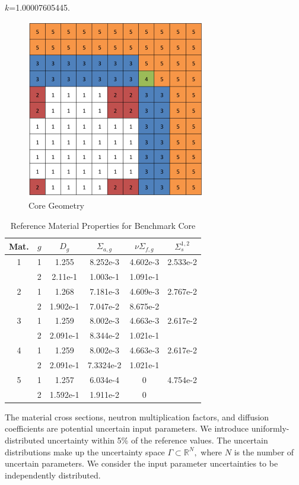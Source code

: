 \documentclass{anstrans} \usepackage{amsmath} \usepackage{amssymb}
\begin{document}
  $k$=1.00007605445.  \begin{figure}[H] \centering \includegraphics[width=0.5\linewidth]{../graphics/core}
    \caption{Core Geometry} \label{geom} \end{figure} \begin{table}[h] \centering \begin{tabular}{c c | c c c
      c} Mat. & $g$ & $D_g$ & $\Sigma_{a,g}$ & $\nu\Sigma_{f,g}$ & $\Sigma_s^{1,2}$ \\ \hline 1 & 1 & 1.255 &
      8.252e-3 & 4.602e-3 & 2.533e-2 \\ & 2 & 2.11e-1 & 1.003e-1 & 1.091e-1 & \\ \hline 2 & 1 & 1.268 &
      7.181e-3 & 4.609e-3 & 2.767e-2 \\ & 2 & 1.902e-1 & 7.047e-2 & 8.675e-2 & \\ \hline 3 & 1 & 1.259 &
      8.002e-3 & 4.663e-3 & 2.617e-2 \\ & 2 & 2.091e-1 & 8.344e-2 & 1.021e-1 & \\ \hline 4 & 1 & 1.259 &
      8.002e-3 & 4.663e-3 & 2.617e-2 \\ & 2 & 2.091e-1 & 7.3324e-2 & 1.021e-1 & \\ \hline 5 & 1 & 1.257 &
      6.034e-4 & 0 & 4.754e-2 \\ & 2 & 1.592e-1 & 1.911e-2 & 0 & \end{tabular} \caption{Reference Material
    Properties for Benchmark Core} \label{tab:coremats} \end{table}

The material cross sections, neutron multiplication factors, and diffusion coefficients are potential
uncertain input parameters.  We introduce uniformly-distributed uncertainty within 5\% of the reference
values.  The uncertain distributions make up the uncertainty space $\Gamma\subset\mathbb{R}^N,$ where $N$ is
the number of uncertain parameters.
We consider the input parameter uncertainties to be independently distributed.
\end{document}
